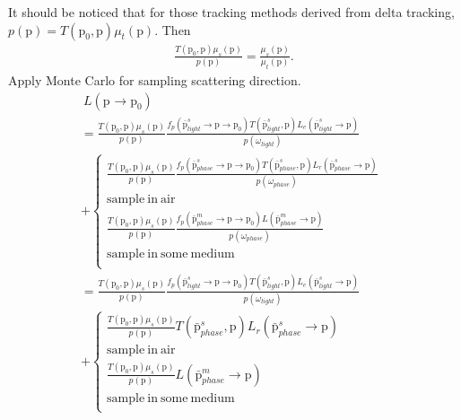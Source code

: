 \documentclass[acmtog]{acmart}
\def\w{\omega}
\def\p{\mathrm{p}}
\def\pp#1#2{\p_{#1}\rightarrow\p_{#2}}
\begin{document}
    It should be noticed that for those tracking methods derived from delta tracking, $p({\p})=T(\p_0,\p)\mu_t(\p)$. Then
\begin{equation} \label{eq14}
\begin{split}
    \frac{T(\p_0,\p)\mu_s(\p)}{p({\p})} = \frac{\mu_s(\p)}{\mu_t(\p)}.
\end{split}
\end{equation}
    Apply Monte Carlo for sampling scattering direction.
\begin{equation} \label{eq15}
\begin{split}
    &\ L(\pp{}{0})\\
    &= \frac{T(\p_0,\p)\mu_s(\p)}{p({\p})} \frac{f_p(\bar{\p}^s_{light}\rightarrow\p\rightarrow\p_0)T(\bar{\p}^s_{light},\p)L_e(\bar{\p}^s_{light}\rightarrow\p)}{p(\w_{light})}\\
    &+ \left\{\begin{aligned}
            \frac{T(\p_0,\p)\mu_s(\p)}{p({\p})} \frac{f_p(\bar{\p}^s_{phase}\rightarrow\p\rightarrow\p_0)T(\bar{\p}^s_{phase},\p)L_r(\bar{\p}^s_{phase}\rightarrow\p)}{p(\w_{phase})}\\
            \mathrm{sample\ in\ air}\\
            \frac{T(\p_0,\p)\mu_s(\p)}{p({\p})} \frac{f_p(\bar{\p}^m_{phase}\rightarrow\p\rightarrow\p_0)L(\bar{\p}^m_{phase}\rightarrow\p)}{p(\w_{phase})}\quad\quad\quad\quad\quad\ \ \\
            \mathrm{sample\ in\ some\ medium}\\
        \end{aligned}\right.\\
    &= \frac{T(\p_0,\p)\mu_s(\p)}{p({\p})} \frac{f_p(\bar{\p}^s_{light}\rightarrow\p\rightarrow\p_0)T(\bar{\p}^s_{light},\p)L_e(\bar{\p}^s_{light}\rightarrow\p)}{p(\w_{light})}\\
    &+ \left\{\begin{aligned}
            \frac{T(\p_0,\p)\mu_s(\p)}{p({\p})} T(\bar{\p}^s_{phase},\p)L_r(\bar{\p}^s_{phase}\rightarrow\p)\\
            \mathrm{sample\ in\ air}\\
            \frac{T(\p_0,\p)\mu_s(\p)}{p({\p})} L(\bar{\p}^m_{phase}\rightarrow\p)\quad\quad\quad\quad\quad\ \ \\
            \mathrm{sample\ in\ some\ medium}\\
        \end{aligned}\right.
\end{split}
\end{equation}
\end{document}
